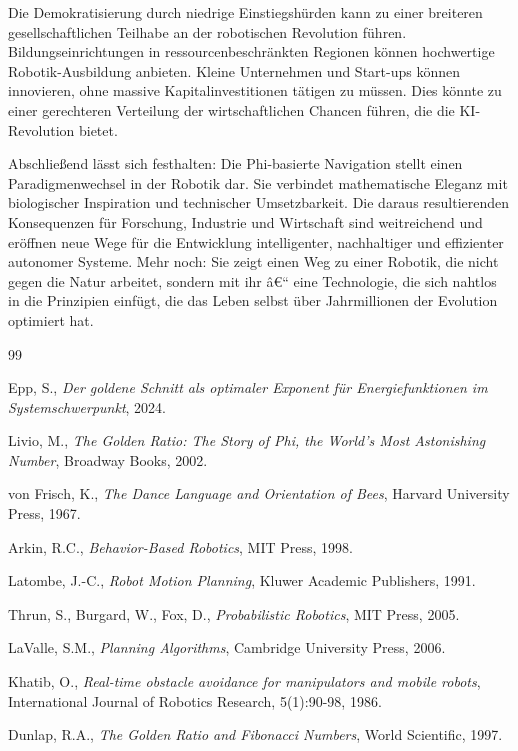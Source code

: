 ﻿\documentclass[a4paper,12pt]{article}
\theoremstyle{definition}
\begin{document}
Die Demokratisierung durch niedrige Einstiegshürden kann zu einer breiteren gesellschaftlichen Teilhabe an der robotischen Revolution führen. Bildungseinrichtungen in ressourcenbeschränkten Regionen können hochwertige Robotik-Ausbildung anbieten. Kleine Unternehmen und Start-ups können innovieren, ohne massive Kapitalinvestitionen tätigen zu müssen. Dies könnte zu einer gerechteren Verteilung der wirtschaftlichen Chancen führen, die die KI-Revolution bietet.

Abschließend lässt sich festhalten: Die Phi-basierte Navigation stellt einen Paradigmenwechsel in der Robotik dar. Sie verbindet mathematische Eleganz mit biologischer Inspiration und technischer Umsetzbarkeit. Die daraus resultierenden Konsequenzen für Forschung, Industrie und Wirtschaft sind weitreichend und eröffnen neue Wege für die Entwicklung intelligenter, nachhaltiger und effizienter autonomer Systeme. Mehr noch: Sie zeigt einen Weg zu einer Robotik, die nicht gegen die Natur arbeitet, sondern mit ihr â€“ eine Technologie, die sich nahtlos in die Prinzipien einfügt, die das Leben selbst über Jahrmillionen der Evolution optimiert hat.

\begin{thebibliography}{99}
	
	Epp, S.,
	\textit{Der goldene Schnitt als optimaler Exponent für Energiefunktionen im Systemschwerpunkt},
	2024.
	
	Livio, M.,
	\textit{The Golden Ratio: The Story of Phi, the World's Most Astonishing Number},
	Broadway Books, 2002.
	
	von Frisch, K.,
	\textit{The Dance Language and Orientation of Bees},
	Harvard University Press, 1967.
	
	Arkin, R.C.,
	\textit{Behavior-Based Robotics},
	MIT Press, 1998.
	
	Latombe, J.-C.,
	\textit{Robot Motion Planning},
	Kluwer Academic Publishers, 1991.
	
	Thrun, S., Burgard, W., Fox, D.,
	\textit{Probabilistic Robotics},
	MIT Press, 2005.
	
	LaValle, S.M.,
	\textit{Planning Algorithms},
	Cambridge University Press, 2006.
	
	Khatib, O.,
	\textit{Real-time obstacle avoidance for manipulators and mobile robots},
	International Journal of Robotics Research, 5(1):90-98, 1986.
	
	Dunlap, R.A.,
	\textit{The Golden Ratio and Fibonacci Numbers},
	World Scientific, 1997.
	
\end{thebibliography}
\end{document}
